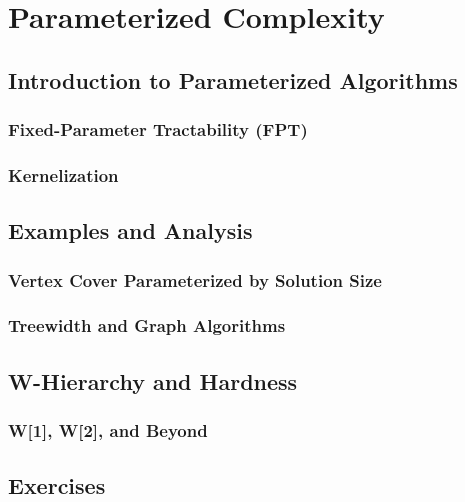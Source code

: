 
\chapter{Parameterized Complexity}
\section{Introduction to Parameterized Algorithms}
\subsection{Fixed-Parameter Tractability (FPT)}
\subsection{Kernelization}

\section{Examples and Analysis}
\subsection{Vertex Cover Parameterized by Solution Size}
\subsection{Treewidth and Graph Algorithms}

\section{W-Hierarchy and Hardness}
\subsection{W[1], W[2], and Beyond}

\section{Exercises}